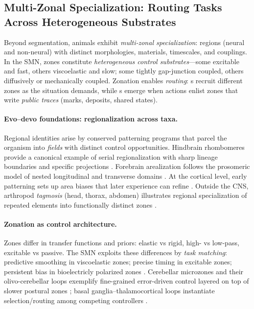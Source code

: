 
\subsection{Multi-Zonal Specialization: Routing Tasks Across Heterogeneous Substrates}
\label{subsec:multizonal}

Beyond segmentation, animals exhibit \emph{multi-zonal specialization}: regions (neural and non-neural) with distinct morphologies, materials, timescales, and couplings.
In the SMN, zones constitute \emph{heterogeneous control substrates}---some excitable and fast, others viscoelastic and slow; some tightly gap-junction coupled, others diffusively or mechanically coupled.
Zonation enables \emph{routing}: \OAP{}s recruit different zones as the situation demands, while \TAP{}s emerge when actions enlist zones that write \emph{public traces} (marks, deposits, shared states).

\paragraph{Evo--devo foundations: regionalization across taxa.}
Regional identities arise by conserved patterning programs that parcel the organism into \emph{fields} with distinct control opportunities.
Hindbrain rhombomeres provide a canonical example of serial regionalization with sharp lineage boundaries and specific projections \cite{LumsdenKrumlauf1996Hindbrain}.
Forebrain arealization follows the prosomeric model of nested longitudinal and transverse domains \cite{PuellesRubenstein2003Prosomeric}.
At the cortical level, early patterning sets up area biases that later experience can refine \cite{SurRubenstein2005CortexPatternPlasticity}.
Outside the CNS, arthropod \emph{tagmosis} (head, thorax, abdomen) illustrates regional specialization of repeated elements into functionally distinct zones \cite{Scholtz2010Tagmosis}.

\paragraph{Zonation as control architecture.}
Zones differ in transfer functions and priors: elastic vs rigid, high- vs low-pass, excitable vs passive.
The SMN exploits these differences by \emph{task matching}: predictive smoothing in viscoelastic zones; precise timing in excitable zones; persistent bias in bioelectricly polarized zones \cite{Levin2014MolecularBioelectricity}.
Cerebellar microzones and their olivo-cerebellar loops exemplify fine-grained error-driven control layered on top of slower postural zones \cite{AppsHawkes2009CerebellarZones}; basal ganglia–thalamocortical loops instantiate selection/routing among competing controllers \cite{AlexanderDeLongStrick1986ParallelLoops}.


